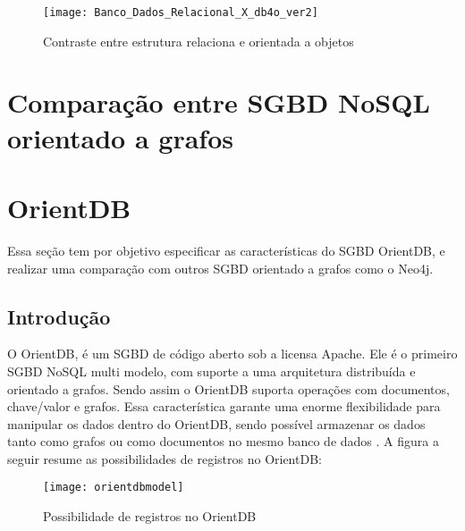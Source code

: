 \begin{figure}[h]
	\centering
    \texttt{[image: Banco\_Dados\_Relacional\_X\_db4o\_ver2]}
    \caption{Contraste entre estrutura relaciona e orientada a objetos}
    \label{fig:db4o}
\end{figure} 

\section{Comparação entre SGBD NoSQL orientado a grafos}


\section{OrientDB}

	Essa seção tem por objetivo especificar as características do SGBD OrientDB, e realizar uma comparação com outros SGBD orientado a grafos como o Neo4j.
	
\subsection{Introdução}
	
	O OrientDB, é um SGBD de código aberto sob a licensa Apache. Ele é o primeiro SGBD NoSQL multi modelo, com suporte a uma arquitetura distribuída e orientado a grafos. Sendo assim o OrientDB suporta operações com documentos, chave/valor e grafos. Essa característica garante uma enorme flexibilidade para manipular os dados dentro do OrientDB, sendo possível armazenar os dados tanto como grafos ou como documentos no mesmo banco de dados \cite{OrientDB}. A figura a seguir resume as possibilidades de registros no OrientDB:
	
\begin{figure}[h]
	\centering
    \texttt{[image: orientdbmodel]}
    \caption{Possibilidade de registros no OrientDB}
    \label{fig:orientdbpossibilities}
\end{figure}
	
